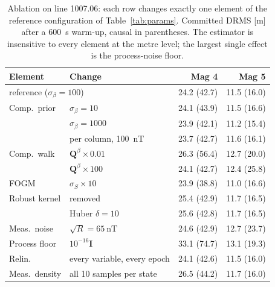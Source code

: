 \begin{table}[t]
\caption{Ablation on line 1007.06: each row changes exactly one element of the
reference configuration of Table~\ref{tab:params}. Committed DRMS [m] after a
\SI{600}{\second} warm-up, causal in parentheses. The estimator is insensitive
to every element at the metre level; the largest single effect is the
process-noise floor.}
\label{tab:ablation}
\centering
\setlength{\tabcolsep}{4pt}
\begin{tabular}{l l rr}
\toprule
Element & Change & Mag 4 & Mag 5 \\
\midrule
\multicolumn{2}{l}{reference ($\sigma_{\beta}=100$)} & 24.2 (42.7) & 11.5 (16.0) \\
\midrule
Comp.\ prior & $\sigma_{\beta}=10$ & 24.1 (43.9) & 11.5 (16.6) \\
 & $\sigma_{\beta}=1000$ & 23.9 (42.1) & 11.2 (15.4) \\
 & per column, \SI{100}{\nano\tesla} & 23.7 (42.7) & 11.6 (16.1) \\
Comp.\ walk & $\mathbf{Q}^{\beta}\times0.01$ & 26.3 (56.4) & 12.7 (20.0) \\
 & $\mathbf{Q}^{\beta}\times100$ & 24.1 (42.7) & 12.4 (25.8) \\
FOGM & $\sigma_S\times10$ & 23.9 (38.8) & 11.0 (16.6) \\
Robust kernel & removed & 25.4 (42.9) & 11.7 (16.5) \\
 & Huber $\delta=10$ & 25.6 (42.8) & 11.7 (16.5) \\
Meas.\ noise & $\sqrt{R}=\SI{65}{\nano\tesla}$ & 24.6 (42.9) & 12.7 (23.7) \\
Process floor & $10^{-16}\mathbf{I}$ & 33.1 (74.7) & 13.1 (19.3) \\
Relin. & every variable, every epoch & 24.1 (42.6) & 11.5 (16.0) \\
Meas.\ density & all \num{10} samples per state & 26.5 (44.2) & 11.7 (16.0) \\
\bottomrule
\end{tabular}
\end{table}
